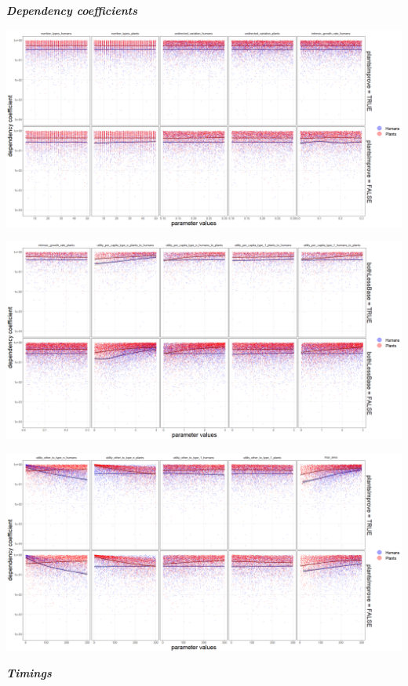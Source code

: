 \documentclass[
]{book}
\begin{document}
\textbf{\emph{Dependency coefficients}}

\includegraphics[width=1\linewidth]{plots/5_LHS_plantsImprove_dependency_coefficients_bifurcationPlot_twoVariables_per_parameter_and_scenario_part1}

\includegraphics[width=1\linewidth]{plots/5_LHS_dependency_coefficients_bifurcationPlot_twoVariables_per_parameter_and_scenario_part2}

\includegraphics[width=1\linewidth]{plots/5_LHS_plantsImprove_dependency_coefficients_bifurcationPlot_twoVariables_per_parameter_and_scenario_part3}

\textbf{\emph{Timings}}
\end{document}
